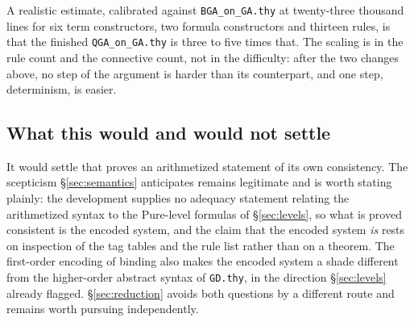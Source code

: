 \noindent
A realistic estimate, calibrated against \texttt{BGA\_on\_GA.thy} at twenty-three
thousand lines for six term constructors, two formula constructors and thirteen
rules, is that the finished \texttt{QGA\_on\_GA.thy} is three to five times that.
The scaling is in the rule count and the connective count, not in the difficulty:
after the two changes above, no step of the argument is harder than its \BGA{}
counterpart, and one step, determinism, is easier.

\subsection{What this would and would not settle}

It would settle that \QGA{} proves an arithmetized statement of its own
consistency.  The scepticism \S\ref{sec:semantics} anticipates remains
legitimate and is worth stating plainly: the development supplies no adequacy
statement relating the arithmetized syntax to the Pure-level formulas of
\S\ref{sec:levels}, so what is proved consistent is the encoded system, and the
claim that the encoded system \emph{is} \QGA{} rests on inspection of the tag
tables and the rule list rather than on a theorem.  The first-order encoding of
binding also makes the encoded system a shade different from the higher-order
abstract syntax of \texttt{GD.thy}, in the direction \S\ref{sec:levels} already
flagged.  \S\ref{sec:reduction} avoids both questions by a different route and
remains worth pursuing independently.
